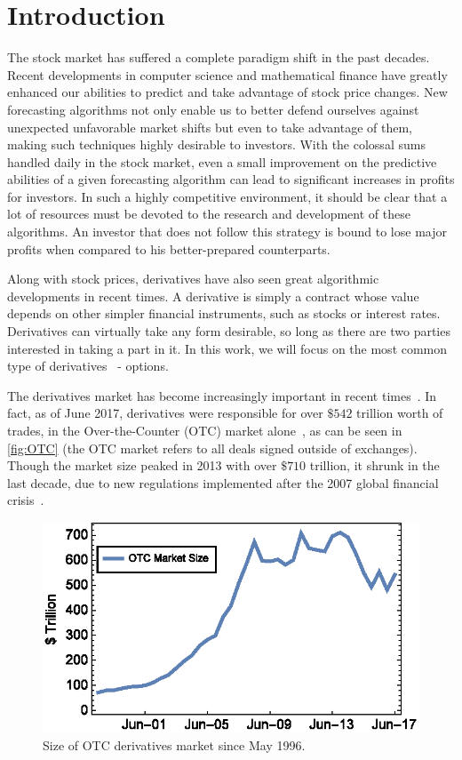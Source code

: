 \documentclass[a4paper,twocolumn,aps,prd,longbibliography,superscriptaddress]{revtex4-1}
\begin{document}
\section{Introduction}
The stock market has suffered a complete paradigm shift in the past decades. Recent developments in computer science and mathematical finance have greatly enhanced our abilities to predict and take advantage of stock price changes. New forecasting algorithms not only enable us to better defend ourselves against unexpected unfavorable market shifts but even to take advantage of them, making such techniques highly desirable to investors.
With the colossal sums handled daily in the stock market, even a small improvement on the predictive abilities of a given forecasting algorithm can lead to significant increases in profits for investors. In such a highly competitive environment, it should be clear that a lot of resources must be devoted to the research and development of these algorithms. An investor that does not follow this strategy is bound to lose major profits when compared to his better-prepared counterparts.




Along with stock prices, derivatives have also seen great algorithmic developments in recent times. A derivative is simply a contract whose value depends on other simpler financial instruments, such as stocks or interest rates. Derivatives can virtually take any form desirable, so long as there are two parties interested in taking a part in it. In this work, we will focus on the most common type of derivatives~\cite{Hull} - options.

The derivatives market has become increasingly important in recent times~\cite{Hull}. In fact, as of June 2017, derivatives were responsible for over $\$542$ trillion worth of trades, in the Over-the-Counter (OTC) market alone~\cite{BIS}, as can be seen in \autoref{fig:OTC} (the OTC market refers to all deals signed outside of exchanges). Though the market size peaked in 2013 with over $\$710$ trillion, it shrunk in the last decade, due to new regulations implemented after the 2007 global financial crisis~\cite{FT}.

\begin{figure}[H]
    \centering
      \includegraphics[width=.9\columnwidth,trim={2pt 17pt 0 0},clip]{OTC.eps}
      \caption{Size of OTC derivatives market since May 1996.}\label{fig:OTC}
    \end{figure}
\end{document}
